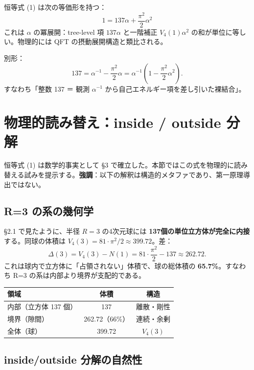 \documentclass[a4paper,11pt]{ltjsarticle}
\begin{document}
恒等式 (1) は次の等価形を持つ：
\begin{equation}
1 = 137 \alpha + \frac{\pi^2}{2} \alpha^2 \tag{3}
\end{equation}
これは $\alpha$ の冪展開：tree-level 項 $137\alpha$ と一階補正 $V_4(1)\alpha^2$ の和が単位に等しい。物理的には QFT の摂動展開構造と類比される。

別形：
\begin{equation}
137 = \alpha^{-1} - \frac{\pi^2}{2} \alpha = \alpha^{-1}\left(1 - \frac{\pi^2}{2}\alpha^2\right). \tag{4}
\end{equation}
すなわち「整数 137 ＝ 観測 $\alpha^{-1}$ から自己エネルギー項を差し引いた裸結合」。

\section{物理的読み替え：inside / outside 分解}

恒等式 (1) は数学的事実として §3 で確立した。本節ではこの式を物理的に読み替える試みを提示する。\textbf{強調}：以下の解釈は構造的メタファであり、第一原理導出ではない。

\subsection{R=3 の系の幾何学}

§2.1 で見たように、半径 $R=3$ の4次元球には \textbf{137個の単位立方体が完全に内接}する。同球の体積は $V_4(3) = 81 \cdot \pi^2/2 \approx 399.72$。差：
\[ \Delta(3) = V_4(3) - N(1) = 81 \cdot \frac{\pi^2}{2} - 137 \approx 262.72. \]
これは球内で立方体に「占領されない」体積で、球の総体積の \textbf{65.7\%}。すなわち R=3 の系は内部より境界が支配的である。

\begin{center}
\begin{tabular}{lcc}
\toprule
領域 & 体積 & 構造 \\
\midrule
内部（立方体 137 個） & 137 & 離散・剛性 \\
境界（隙間） & 262.72（66\%） & 連続・余剰 \\
全体（球） & 399.72 & $V_4(3)$ \\
\bottomrule
\end{tabular}
\end{center}

\subsection{inside/outside 分解の自然性}
\end{document}
